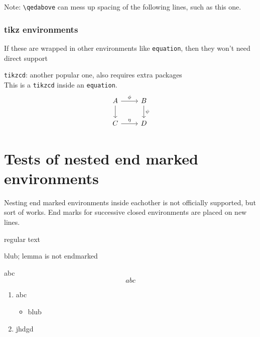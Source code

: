 Note: \verb|\qedabove| can mess up spacing of the following lines, such as this one.



\subsubsection*{tikz environments}
If these are wrapped in other environments like \texttt{equation}, then they won't need direct support


\begin{test}
  \texttt{tikzcd}:
  another popular one, also requires extra packages\\
  This is a \texttt{tikzcd} inside an \texttt{equation}.
  \begin{equation}
    \begin{tikzcd}
      A \arrow[r, "\phi"] \arrow[d]
      & B \arrow[d, "\psi"] \\
      C \arrow[r, "\eta"]
      & D
    \end{tikzcd}
  \end{equation}
\end{test}


\section{Tests of nested end marked environments}
Nesting end marked environments inside eachother is not officially supported, but sort of works.
End marks for successive closed environments are placed on new lines.

\begin{theorem}
  regular text
  \begin{lemma}
    blub; lemma is not endmarked
  \end{lemma}
  \begin{lemma}
    abc
    \begin{equation*}
      abc
    \end{equation*}
    \begin{enumerate}
    \item abc
      \begin{itemize}
      \item blub
      \end{itemize}
    \item jhdgd
    \end{enumerate}
  \end{lemma}
\end{theorem}

